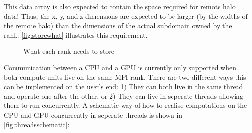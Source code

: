 \documentclass{article}
\begin{document}
This data array is also expected to contain the space required for remote halo data! Thus, the x, y, and z dimensions are expected to be larger (by the widths of the remote halo) than the dimensions of the actual subdomain owned by the rank. \autoref{fig:storewhat} illustrates this requirement.

\begin{figure}[ht]\centering
    \caption{What each rank needs to store \label{fig:storewhat}}
\end{figure}


Communication between a CPU and a GPU is currently only supported when both compute units live on the same MPI rank. There are two different ways this can be implemented on the user's end: 1) They can both live in the same thread and operate one after the other, or 2) They can live in seperate threads allowing them to run concurrently. A schematic way of how to realise computations on the CPU and GPU concurrently in seperate threads is shown in \autoref{fig:threadsschematic}:
\end{document}
